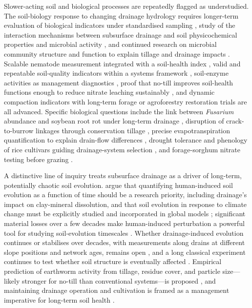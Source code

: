 \documentclass[11pt]{article}
\begin{document}
Slower-acting soil and biological processes are repeatedly flagged as understudied. The soil-biology response to changing drainage hydrology requires longer-term evaluation of biological indicators under standardised sampling \parencite{Sherbine2023}, study of the interaction mechanisms between subsurface drainage and soil physicochemical properties and microbial activity \parencite{Yang2025}, and continued research on microbial community structure and function to explain tillage and drainage impacts \parencite{Kaur2024b,Kumar2014}. Scalable nematode measurement integrated with a soil-health index \parencite{Li2023b}, valid and repeatable soil-quality indicators within a systems framework \parencite{Nakajima2015}, soil-enzyme activities as management diagnostics \parencite{Singh2007}, proof that no-till improves soil-health functions enough to reduce nitrate leaching sustainably \parencite{Masri2024}, and dynamic compaction indicators with long-term forage or agroforestry restoration trials \parencite{Caron2025} are all advanced. Specific biological questions include the link between \textit{Fusarium} abundance and soybean root rot under long-term drainage \parencite{Han2017}, disruption of crack-to-burrow linkages through conservation tillage \parencite{Shipitalo2004}, precise evapotranspiration quantification to explain drain-flow differences \parencite{Daigh2014}, drought tolerance and phenology of rice cultivars guiding drainage-system selection \parencite{DarziNaftchali2017b}, and forage-sorghum nitrate testing before grazing \parencite{Nash2017}.

A distinctive line of inquiry treats subsurface drainage as a driver of long-term, potentially chaotic soil evolution. \textcite{Montagne2009} argue that quantifying human-induced soil evolution as a function of time should be a research priority, including drainage's impact on clay-mineral dissolution, and that soil evolution in response to climate change must be explicitly studied and incorporated in global models \parencite{Montagne2010}; significant material losses over a few decades make human-induced perturbation a powerful tool for studying soil-evolution timescales \parencite{Montagne2013}. Whether drainage-induced evolution continues or stabilises over decades, with measurements along drains at different slope positions and network ages, remains open \parencite{Frison2009}, and a long classical experiment continues to test whether soil structure is eventually affected \parencite{HOOGHOUDT1952}. Empirical prediction of earthworm activity from tillage, residue cover, and particle size---likely stronger for no-till than conventional systems---is proposed \parencite{Ouellet2008}, and maintaining drainage operation and cultivation is framed as a management imperative for long-term soil health \parencite{Singh2007}.
\end{document}
